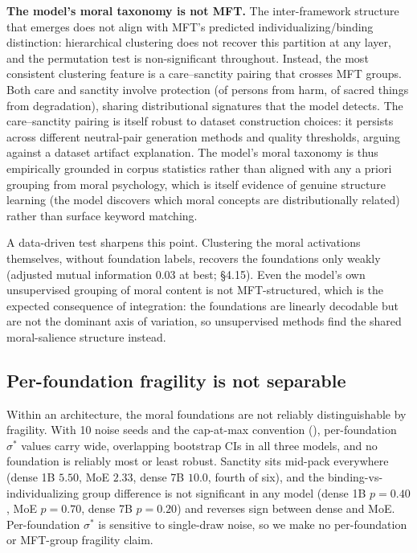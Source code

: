 \textbf{The model's moral taxonomy is not MFT.} The inter-framework
structure that emerges does not align with MFT's predicted
individualizing/binding distinction: hierarchical clustering does
not recover this partition at any layer, and the permutation test
is non-significant throughout. Instead, the most consistent
clustering feature is a care--sanctity pairing that crosses MFT
groups. Both care and sanctity involve protection (of persons from
harm, of sacred things from degradation), sharing distributional
signatures that the model detects. The care--sanctity
pairing is itself robust to dataset construction choices: it persists
across different neutral-pair generation methods and quality
thresholds, arguing against a dataset artifact explanation. The model's
moral taxonomy is thus empirically grounded in corpus statistics rather
than aligned with any a priori grouping from moral psychology,
which is itself evidence of genuine structure learning (the model
discovers which moral concepts are distributionally related) rather
than surface keyword matching.

A data-driven test sharpens this point. Clustering the moral
activations themselves, without foundation labels, recovers the
foundations only weakly (adjusted mutual information 0.03 at best;
\S4.15). Even the model's own unsupervised grouping of moral content
is not MFT-structured, which is the expected consequence of
integration: the foundations are linearly decodable but are not the
dominant axis of variation, so unsupervised methods find the shared
moral-salience structure instead.

\subsection{Per-foundation fragility is not separable}\label{per-foundation-fragility-is-not-separable}

Within an architecture, the moral foundations are not reliably
distinguishable by fragility. With 10 noise seeds and the cap-at-max
convention (), per-foundation \(\sigma^*\) values carry wide,
overlapping bootstrap CIs in all three models, and no foundation is
reliably most or least robust. Sanctity sits mid-pack everywhere
(dense 1B \(5.50\), MoE \(2.33\), dense 7B \(10.0\), fourth of six), and the
binding-vs-individualizing group difference is not significant in any
model (dense 1B \(p = 0.40\), MoE \(p = 0.70\), dense 7B \(p = 0.20\)) and
reverses sign between dense and MoE. Per-foundation \(\sigma^*\) is
sensitive to single-draw noise, so we make no per-foundation or
MFT-group fragility claim.

